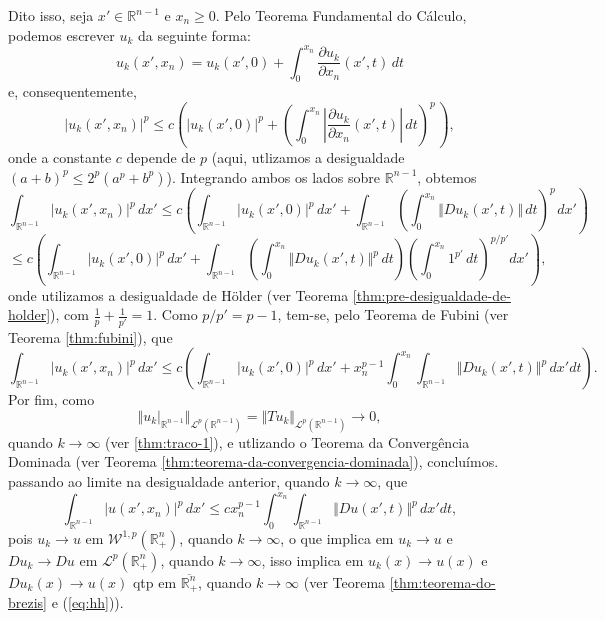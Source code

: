 \documentclass[a4paper, 11pt]{book}
\theoremstyle{definition}
\newcommand{\bR}{\mathbb{R}}
\newcommand{\cL}{\mathcal{L}}
\newcommand{\cW}{\mathcal{W}}
\begin{document}
\begin{prf}
    Dito isso, seja $x' \in \bR^{n-1}$ e $x_n \geqslant 0$.
    Pelo Teorema Fundamental do Cálculo, podemos escrever $u_k$ da seguinte forma:
    \[
        u_k(x'\!,x_n) = u_k(x'\!,0) + \int_0^{x_n} \dfrac{\partial u_k}{\partial x_n} (x'\!,t) \,dt
    \]
    e, consequentemente,
    \[
        |u_k(x'\!,x_n)|^p \leqslant c \left(  |u_k(x'\!,0)|^p + \left(  \int_0^{x_n} \left|\dfrac{\partial u_k}{\partial x_n} (x'\!,t)\right| \,dt\right)^{\!p\,} \right),
    \]
    onde a constante $c$ depende de $p$ (aqui, utlizamos a desigualdade $(a + b)^p \leqslant 2^p (a^p + b^p)$). Integrando ambos os lados sobre $\bR^{n-1}$, obtemos
    \[
        \int_{\bR^{n-1}} |u_k(x',x_n)|^p \,dx' \leqslant c \left( \int_{\bR^{n-1}} |u_k(x',0)|^p \,dx' + \int_{\bR^{n-1}} \left(  \int_0^{x_n} \Vert Du_k(x',t) \Vert \,dt\right)^{\!p\,} dx' \right)
    \]
    \[
        \leqslant  c \left( \int_{\bR^{n-1}} |u_k(x',0)|^p \,dx' + \int_{\bR^{n-1}} \left( \int_0^{x_n} \Vert Du_k (x',t) \Vert^p \,dt \right)\left( \int_0^{x_n} 1^{p'} \,dt \right)^{p/p'} dx'\right),
    \]
    onde utilizamos a desigualdade de Hölder (ver Teorema \ref{thm:pre-desigualdade-de-holder}), com $\frac{1}{p}+ \frac{1}{p'} = 1$.
    Como $p/p' = p-1$, tem-se, pelo Teorema de Fubini (ver Teorema \ref{thm:fubini}), que
    \[
        \int_{\bR^{n-1}} |u_k(x',x_n)|^p \,dx' \leqslant c \left( \int_{\bR^{n-1}} |u_k(x',0)|^p \,dx' + x_n^{p-1} \int_{0}^{x_n} \int_{\bR^{n-1}} \Vert Du_k (x',t) \Vert^p  \,dx'dt \right).
    \]
    Por fim, como
    \[
        \Vert u_k |_{\bR^{n-1}} \Vert_{\cL^p(\bR^{n-1})} = \Vert Tu_k \Vert_{\cL^p(\bR^{n-1})} \to 0,
    \]
    quando $k \to \infty$ (ver \ref{thm:traco-1}), e utlizando o Teorema da Convergência Dominada (ver Teorema \ref{thm:teorema-da-convergencia-dominada}), concluímos. passando ao limite na desigualdade anterior, quando $k \to \infty$, que
    \begin{equation} \label{eq:uuuuu}
        \int_{\bR^{n-1}} |u(x',x_n)|^p \,dx' \leqslant  c x_n^{p-1}\int_0^{x_n} \int_{\bR^{n-1}} \Vert Du(x',t) \Vert^p \,dx'dt,
    \end{equation}
    pois $u_k \to u$ em $\cW^{1,p}(\bR^n_+)$, quando $k \to \infty$, o que implica em $u_k \to u$ e $Du_k \to Du$ em $\cL^p(\bR^n_+)$, quando $k \to \infty$, isso implica em $u_k(x) \to u(x)$ e $Du_k(x) \to u(x)$ qtp em $\overline{\bR^n_+}$, quando $k \to \infty$ (ver Teorema \ref{thm:teorema-do-brezis} e (\ref{eq:hh})).
    
    \begin{figure}
        \centering
\end{figure}
\end{prf}
\end{document}

